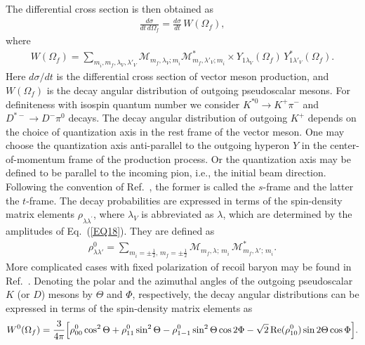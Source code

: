 \documentclass[a4paper,12pt]{article}
\begin{document}
The differential cross section is then obtained as
\begin{eqnarray}
\frac{d\sigma}{dt \, d\Omega_f} = \frac{d\sigma}{dt}\,W(\Omega_f),
\label{EQ10}
\end{eqnarray}
where
\begin{eqnarray}
W(\Omega_f) = \sum\limits_{m_i^{},m_f^{},\lambda_V^{},\lambda'_V}
\mathcal{M}_{m_f^{},\lambda_V^{};m_i^{}}
\mathcal{M}_{m_f^{},\lambda'_V;m_i^{}}^*
 \mbox{} \times
Y_{1\lambda_V^{}}(\Omega_f)\,Y^*_{1\lambda'_V}(\Omega_f).
\label{EQ11}
\end{eqnarray}
Here $ {d\sigma}/{dt}$ is the differential cross section of vector meson production,
and  $W(\Omega_f)$ is the decay angular distribution of outgoing pseudoscalar mesons.
For definiteness with isospin quantum number we consider
$K^{*0} \to K^+ \pi^-$ and $D^{*-} \to D^- \pi^0$ decays.
The decay angular distribution of outgoing $K^+$ depends on the choice
of quantization axis in the rest frame of the vector meson.
One may choose the quantization axis anti-parallel to the outgoing hyperon $Y$ in
the center-of-momentum frame of the production process.
Or the quantization axis may be defined to be parallel to the incoming pion, i.e., the
initial beam direction.
Following the convention of Ref.~\cite{CGLS72}, the former is called the $s$-frame and
the latter the $t$-frame.
The decay probabilities are expressed in terms of the spin-density matrix elements
$\rho_{\lambda\lambda^\prime}^{}$, where $\lambda_V^{}$ is abbreviated as $\lambda$,
which are determined by the amplitudes of Eq.~(\ref{EQ18}).
They are defined as
\begin{eqnarray}
\rho^0_{\lambda\lambda'} = \sum\limits_{m_i^{} = \pm\frac12,\, m_f^{} = \pm\frac12}
\mathcal{M}_{m_f^{},\lambda^{};\,m_i^{}}\, \mathcal{M}^*_{m_f^{},\lambda';\,m_i^{}} .
\label{EQ13}
\end{eqnarray}
More complicated cases with fixed polarization
of recoil baryon may be found in Ref.~\cite{SOT}.
Denoting the polar and the azimuthal angles of the outgoing pseudoscalar $K$ (or $D$) mesons
by $\Theta$ and $\Phi$, respectively, the decay angular distributions can be expressed
in terms of the spin-density matrix elements as
\begin{eqnarray}
W^{0}(\Omega_f) = \frac{3}{4\pi} \Bigl[ \rho^0_{00}\cos^2\Theta + \rho^0_{11}\sin^2\Theta
- \rho^0_{1-1} \sin^2\Theta \cos2\Phi
- {\sqrt{2}}\, \mathrm{Re}(\rho^0_{10}) \sin2\Theta\cos\Phi \Bigr].
\label{EQ15}
\end{eqnarray}
\end{document}
